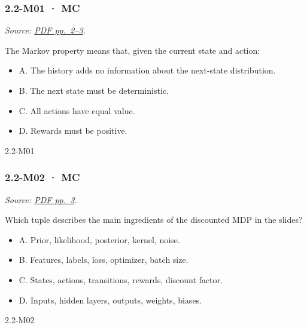 \noindent\begin{minipage}{\linewidth}

\subsubsection{2.2-M01 · MC}\label{m01-mc-4}

\emph{Source:
\href{../Lecture\%20Slides/2.2.\%20Markov\%20decision\%20processes.pdf\#page=2}{PDF
pp.~2--3}.}

The Markov property means that, given the current state and action:

\begin{itemize}
\tightlist
\item
  A. The history adds no information about the next-state distribution.
\item
  B. The next state must be deterministic.
\item
  C. All actions have equal value.
\item
  D. Rewards must be positive.
\end{itemize}

\begin{solution}[8mm]{2.2-M01}

\end{solution}
\end{minipage}\par\medskip

\noindent\begin{minipage}{\linewidth}

\subsubsection{2.2-M02 · MC}\label{m02-mc-4}

\emph{Source:
\href{../Lecture\%20Slides/2.2.\%20Markov\%20decision\%20processes.pdf\#page=3}{PDF
pp.~3}.}

Which tuple describes the main ingredients of the discounted MDP in the
slides?

\begin{itemize}
\tightlist
\item
  A. Prior, likelihood, posterior, kernel, noise.
\item
  B. Features, labels, loss, optimizer, batch size.
\item
  C. States, actions, transitions, rewards, discount factor.
\item
  D. Inputs, hidden layers, outputs, weights, biases.
\end{itemize}

\begin{solution}[8mm]{2.2-M02}

\end{solution}
\end{minipage}\par\medskip

